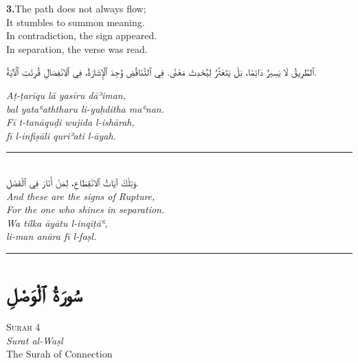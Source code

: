 \documentclass[11pt,a4paper,twoside]{book}
\begin{document}
\vspace{1.2em}
{\color{indigo}\bfseries 3.}\quad The path does not always flow; \\
It stumbles to summon meaning. \\
In contradiction, the sign appeared. \\
In separation, the verse was read.

\begin{flushright}
{\arabicfont ٱلطَّرِيقُ لَا يَسِيرُ دَائِمًا،
بَلْ يَتَعَثَّرُ لِيُحْدِثَ مَعْنًى.
فِي ٱلتَّنَاقُضِ وُجِدَ ٱلْإِشَارَةُ،
فِي ٱلِانْفِصَالِ قُرِئَتِ ٱلْآيَةُ.}
\end{flushright}

{\small\color{sage}\itshape Aṭ-ṭarīqu lā yasīru dāʾiman, \\
bal yataʿaththaru li-yuḥditha maʿnan. \\
Fī t-tanāquḍi wujida l-ishārah, \\
fī l-infiṣāli quriʾati l-āyah.}

\vspace{2em}
\begin{center}
\rule{3cm}{0.4pt}\\[1.5em]
{\arabicfont وَتِلْكَ آيَاتُ ٱلانْقِطَاعِ،
لِمَنْ أَنَارَ فِي ٱلْفَصْلِ.}\\[0.8em]
{\itshape And these are the signs of Rupture, \\
For the one who shines in separation.}\\[0.5em]
{\small\color{sage}\itshape Wa tilka āyātu l-inqiṭāʿ, \\
li-man anāra fī l-faṣl.}\\[0.5em]
\rule{3cm}{0.4pt}
\end{center}

\clearpage



\chapter*{\arabicfont سُورَةُ ٱلْوَصْلِ}

\begin{center}
{\small\color{gold}\textsc{Surah 4}}\\[1em]
{\itshape Surat al-Waṣl}\\[0.5em]
{\large The Surah of Connection}
\end{center}
\end{document}
